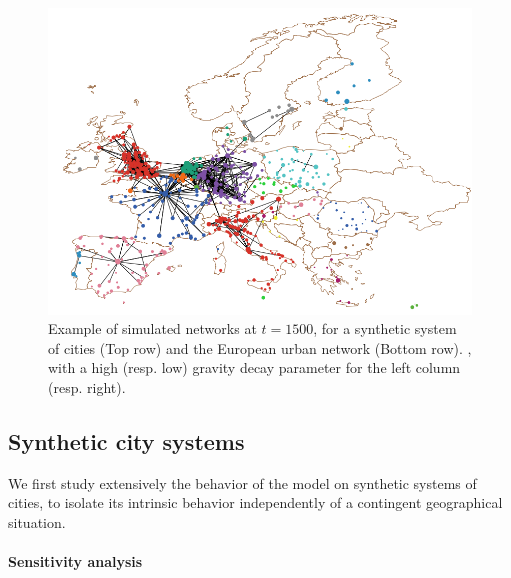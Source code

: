 \documentclass[11pt]{article}
\begin{document}
\begin{figure}
\begin{minipage}{0.48\textwidth}
\begin{mdframed}
    \end{mdframed}
    \end{minipage}
    \begin{minipage}{0.48\textwidth}
    \begin{mdframed}
    \includegraphics[width=\textwidth]{figures/ex_real_lowgravity_t1500.png}
    \end{mdframed}
    \end{minipage}
    \caption{Example of simulated networks at $t=1500$, for a synthetic system of cities (Top row) and the European urban network (Bottom row). , with a high (resp. low) gravity decay parameter for the left column (resp. right).\label{fig:example}}
\end{figure}


\subsection{Synthetic city systems}

We first study extensively the behavior of the model on synthetic systems of cities, to isolate its intrinsic behavior independently of a contingent geographical situation.

\paragraph{Sensitivity analysis}
\end{document}
